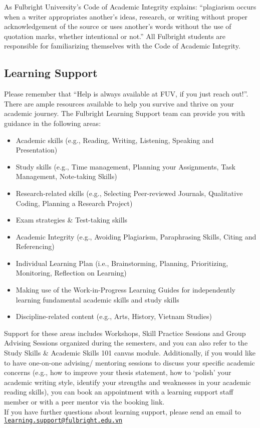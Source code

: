 \documentclass[
]{article}
\providecommand{\tightlist}{%
  \setlength{\itemsep}{0pt}\setlength{\parskip}{0pt}}
\begin{document}
As Fulbright University's Code of Academic Integrity explains: ``plagiarism occurs when a writer appropriates another's ideas, research, or writing without proper acknowledgement of the source or uses another's words without the use of quotation marks, whether intentional or not.'' All Fulbright students are responsible for familiarizing themselves with the Code of Academic Integrity.

\hypertarget{learning-support}{%
\subsection*{Learning Support}\label{learning-support}}

Please remember that ``Help is always available at FUV, if you just reach out!''. There are ample resources available to help you survive and thrive on your academic journey. The Fulbright Learning Support team can provide you with guidance in the following areas:

\begin{itemize}
\tightlist
\item
  Academic skills (e.g., Reading, Writing, Listening, Speaking and Presentation)
\item
  Study skills (e.g., Time management, Planning your Assignments, Task Management, Note-taking Skills)\\
\item
  Research-related skills (e.g., Selecting Peer-reviewed Journals, Qualitative Coding, Planning a Research Project)
\item
  Exam strategies \& Test-taking skills\\
\item
  Academic Integrity (e.g., Avoiding Plagiarism, Paraphrasing Skills, Citing and Referencing)
\item
  Individual Learning Plan (i.e., Brainstorming, Planning, Prioritizing, Monitoring, Reflection on Learning)
\item
  Making use of the Work-in-Progress Learning Guides for independently learning fundamental academic skills and study skills
\item
  Discipline-related content (e.g., Arts, History, Vietnam Studies)
\end{itemize}

Support for these areas includes Workshops, Skill Practice Sessions and Group Advising Sessions organized during the semesters, and you can also refer to the Study Skills \& Academic Skills 101 canvas module. Additionally, if you would like to have one-on-one advising/ mentoring sessions to discuss your specific academic concerns (e.g., how to improve your thesis statement, how to `polish' your academic writing style, identify your strengths and weaknesses in your academic reading skills), you can book an appointment with a learning support staff member or with a peer mentor via the booking link.\\
If you have further questions about learning support, please send an email to \href{mailto:learning.support@fulbright.edu.vn}{\nolinkurl{learning.support@fulbright.edu.vn}}
\end{document}
